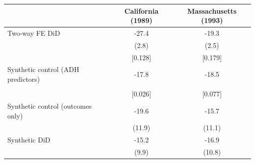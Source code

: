 \begin{tabular}{lcc}
\toprule
 & California (1989) & Massachusetts (1993) \\
\midrule
Two-way FE DiD & -27.4 & -19.3 \\
 & (2.8) & (2.5) \\
 & [0.128] & [0.179] \\
\addlinespace
Synthetic control (ADH predictors) & -17.8 & -18.5 \\
 &  &  \\
 & [0.026] & [0.077] \\
\addlinespace
Synthetic control (outcomes only) & -19.6 & -15.7 \\
 & (11.9) & (11.1) \\
\addlinespace
Synthetic DiD & -15.2 & -16.9 \\
 & (9.9) & (10.8) \\
\bottomrule
\end{tabular}
